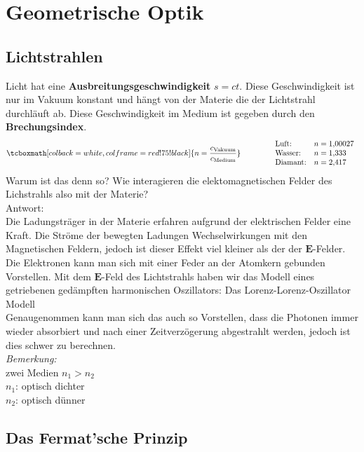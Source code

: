 \documentclass[titlepage,11pt,a4paper,ngerman]{report}
\newcommand{\tx}[1]{\textrm{#1}}
\renewcommand{\vec}[1]{\boldsymbol{#1}}
\newcommand{\lcom}[1]{\color{MidnightBlue}#1\color{black}}
\newcommand{\rmbox}[1]{\tcboxmath[colback=white,colframe=red!75!black]{#1}}
\begin{document}


 
 
\chapter{Geometrische Optik}

\section{Lichtstrahlen}
Licht hat eine \textbf{Ausbreitungsgeschwindigkeit} $ s = ct $. Diese Geschwindigkeit ist nur im Vakuum konstant und hängt von der Materie die der Lichtstrahl durchläuft ab. Diese Geschwindigkeit im Medium ist gegeben durch den \textbf{Brechungsindex}.
\begin{equation*}
\rmbox{n = \frac{c_{\tx{Vakuum}}}{c_{\tx{Medium}}}} \qquad \qquad \begin{array}{ll}
\tx{Luft:} & n = 1{,}00027 \\
\tx{Wasser:} & n = 1{,}333 \\
\tx{Diamant:} & n = 2{,}417
\end{array}
\end{equation*}
\lcom{Warum ist das denn so? Wie interagieren die elektomagnetischen Felder des Lichstrahls also mit der Materie?}\\
Antwort:\\
\lcom{Die Ladungsträger in der Materie erfahren aufgrund der elektrischen Felder eine Kraft. Die Ströme der bewegten Ladungen Wechselwirkungen mit den Magnetischen Feldern, jedoch ist dieser Effekt viel kleiner als der der $ \vec{E} $-Felder.\\
Die Elektronen kann man sich mit einer Feder an der Atomkern gebunden Vorstellen. Mit dem $ \vec{E} $-Feld des Lichtstrahls haben wir das Modell eines getriebenen gedämpften harmonischen Oszillators: Das Lorenz-Lorenz-Oszillator Modell}\\
Genaugenommen kann man sich das auch so Vorstellen, dass die Photonen immer wieder absorbiert und nach einer Zeitverzögerung abgestrahlt werden, jedoch ist dies schwer zu berechnen.\\[10pt]
\emph{Bemerkung:}\\
zwei Medien $ n_1 > n_2 $\\
$ n_1 $: optisch dichter\\
$ n_2 $: optisch dünner

\section{Das Fermat'sche Prinzip}
\end{document}
